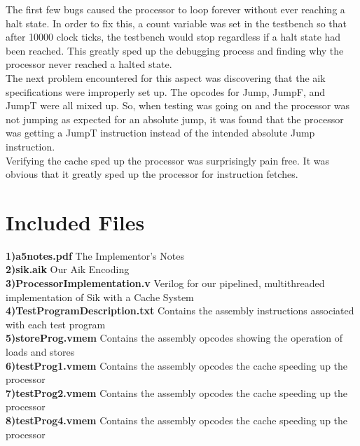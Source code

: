 \documentclass[12pt, twocolumn]{scrartcl}
\begin{document}
The first few bugs caused the processor to loop forever without ever reaching a halt state. In order to fix this, a count variable was set in the testbench so that after 10000 clock ticks, the testbench would stop regardless if a halt state had been reached. This greatly sped up the debugging process and finding why the processor never reached a halted state. \\

The next problem encountered for this aspect was discovering that the aik specifications were improperly set up. The opcodes for Jump, JumpF, and JumpT were all mixed up. So, when testing was going on and the processor was not jumping as expected for an absolute jump, it was found that the processor was getting a JumpT instruction instead of the intended absolute Jump instruction.\\

Verifying the cache sped up the processor was surprisingly pain free. It was obvious that it greatly sped up the processor for instruction fetches.

\section*{Included Files}
\textbf {1)a5notes.pdf} The Implementor's Notes \\
\textbf {2)sik.aik} Our Aik Encoding \\
\textbf {3)ProcessorImplementation.v} Verilog for our pipelined, multithreaded implementation of Sik with a Cache System \\
\textbf {4)Test\textunderscore Program\textunderscore Description.txt} Contains the assembly instructions associated with each test program \\
\textbf {5)storeProg.vmem} Contains the assembly opcodes showing the operation of loads and stores \\
\textbf {6)testProg1.vmem} Contains the assembly opcodes the cache speeding up the processor \\
\textbf {7)testProg2.vmem} Contains the assembly opcodes the cache speeding up the processor \\
\textbf {8)testProg4.vmem} Contains the assembly opcodes the cache speeding up the processor \\
\end{document}
